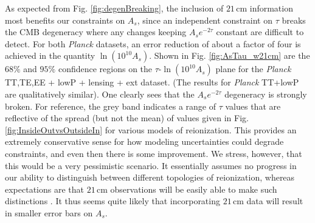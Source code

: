 \documentclass[twocolumn,aps,prd,nofootinbib,showpacs,superscriptaddress]{revtex4-1}
\begin{document}
As expected from Fig. \ref{fig:degenBreaking}, the inclusion of $21\,\textrm{cm}$ information most benefits our constraints on $A_s$, since an independent constraint on $\tau$ breaks the CMB degeneracy where any changes keeping $A_s e^{-2\tau}$ constant are difficult to detect. For both \emph{Planck} datasets, an error reduction of about a factor of four is achieved in the quantity $\ln (10^{10} A_s)$. Shown in Fig. \ref{fig:AsTau_w21cm} are the $68\%$ and $95\%$ confidence regions on the $\tau$-$\ln (10^{10} A_s)$ plane for the \emph{Planck} TT,TE,EE + lowP + lensing + ext dataset. (The results for \emph{Planck} TT+lowP are qualitatively similar). One clearly sees that the $A_s e^{-2\tau}$ degeneracy is strongly broken. For reference, the grey band indicates a range of $\tau$ values that are reflective of the spread (but not the mean) of values given in Fig. \ref{fig:InsideOutvsOutsideIn} for various models of reionization. This provides an extremely conservative sense for how modeling uncertainties could degrade constraints, and even then there is some improvement. We stress, however, that this would be a very pessimistic scenario. It essentially assumes no progress in our ability to distinguish between different topologies of reionization, whereas expectations are that $21\,\textrm{cm}$ observations will be easily able to make such distinctions \cite{choudhury_et_al2009,watkinson_and_pritchard2014}. It thus seems quite likely that incorporating $21\,\textrm{cm}$ data will result in smaller error bars on $A_s$.
\end{document}
